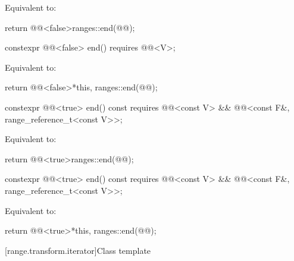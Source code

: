 \begin{itemdescr}
\pnum
\effects
Equivalent to:
\begin{codeblock}
return @@<false>{ranges::end(@@)};
\end{codeblock}
\end{itemdescr}

%
\begin{itemdecl}
constexpr @@<false> end() requires @@<V>;
\end{itemdecl}

\begin{itemdescr}
\pnum
\effects
Equivalent to:
\begin{codeblock}
return @@<false>{*this, ranges::end(@@)};
\end{codeblock}
\end{itemdescr}

%
\begin{itemdecl}
constexpr @@<true> end() const
  requires @@<const V> &&
           @@<const F&, range_reference_t<const V>>;
\end{itemdecl}

\begin{itemdescr}
\pnum
\effects
Equivalent to:
\begin{codeblock}
return @@<true>{ranges::end(@@)};
\end{codeblock}
\end{itemdescr}

%
\begin{itemdecl}
constexpr @@<true> end() const
  requires @@<const V> &&
           @@<const F&, range_reference_t<const V>>;
\end{itemdecl}

\begin{itemdescr}
\pnum
\effects
Equivalent to:
\begin{codeblock}
return @@<true>{*this, ranges::end(@@)};
\end{codeblock}
\end{itemdescr}

[range.transform.iterator]{Class template }

